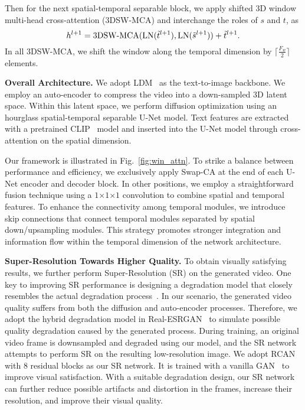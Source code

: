 \documentclass{article}
\begin{document}
Then for the next spatial-temporal separable block, we apply shifted 3D window multi-head cross-attention (3DSW-MCA) and interchange the roles of $s$ and $t$, as
\begin{equation}
    h^{l+1} = \text{3DSW-MCA}(\text{LN}(\Tilde{t}^{l+1}), \text{LN}(\Tilde{s}^{l+1})) + \Tilde{t}^{l+1}.
\label{eq:second_layer}
\end{equation}
In all 3DSW-MCA, we shift the window along the temporal dimension by $\lceil \frac{F_w} 2 \rceil$ elements.

\noindent\textbf{Overall Architecture.}
We adopt LDM~\cite{2022LDM} as the text-to-image backbone.
We employ an auto-encoder to compress the video into a down-sampled 3D latent space.
Within this latent space, we perform diffusion optimization using an hourglass spatial-temporal separable U-Net model.
Text features are extracted with a pretrained CLIP~\cite{CLIP} model and inserted into the U-Net model through cross-attention on the spatial dimension.

Our framework is illustrated in Fig.~\ref{fig:win_attn}.
To strike a balance between performance and efficiency, we exclusively apply Swap-CA at the end of each U-Net encoder and decoder block. In other positions, we employ a straightforward fusion technique using a $1$$\times1$$\times1$ convolution to combine spatial and temporal features.
To enhance the connectivity among temporal modules, we introduce skip connections that connect temporal modules separated by spatial down/upsampling modules.
This strategy promotes stronger integration and information flow within the temporal dimension of the network architecture.

 

\noindent\textbf{Super-Resolution Towards Higher Quality.}
To obtain visually satisfying results, we further perform Super-Resolution (SR) on the generated video. One key to improving SR performance is designing a degradation model that closely resembles the actual degradation process~\cite{SR1,SR2,SR3,SR4,SR5,SR6}. In our scenario, the generated video quality suffers from both the diffusion and auto-encoder processes. Therefore, we adopt the hybrid degradation model in Real-ESRGAN~\cite{Wang_2021_RealESRGAN_ICCV} to simulate possible quality degradation caused by the generated process. 
During training, an original video frame is downsampled and degraded using our model, and the SR network attempts to perform SR on the resulting low-resolution image. 
We adopt RCAN~\cite{zhang2018_RCAN} with 8 residual blocks as our SR network. It is trained with a vanilla GAN~\cite{GAN} to improve visual satisfaction. With a suitable degradation design, our SR network can further reduce possible artifacts and distortion in the frames, increase their resolution, and improve their visual quality.
\end{document}
